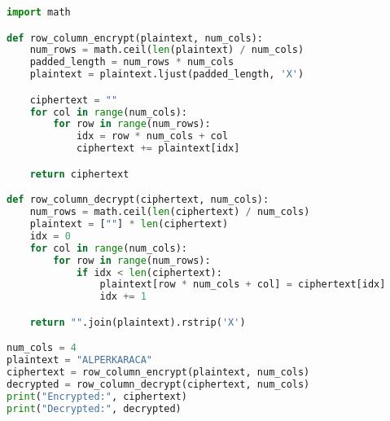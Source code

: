\begin{lstlisting}[language=Python]
import math

def row_column_encrypt(plaintext, num_cols):
    num_rows = math.ceil(len(plaintext) / num_cols)
    padded_length = num_rows * num_cols
    plaintext = plaintext.ljust(padded_length, 'X')

    ciphertext = ""
    for col in range(num_cols):
        for row in range(num_rows):
            idx = row * num_cols + col
            ciphertext += plaintext[idx]

    return ciphertext

def row_column_decrypt(ciphertext, num_cols):
    num_rows = math.ceil(len(ciphertext) / num_cols)
    plaintext = [""] * len(ciphertext)
    idx = 0
    for col in range(num_cols):
        for row in range(num_rows):
            if idx < len(ciphertext):
                plaintext[row * num_cols + col] = ciphertext[idx]
                idx += 1

    return "".join(plaintext).rstrip('X')

num_cols = 4
plaintext = "ALPERKARACA"
ciphertext = row_column_encrypt(plaintext, num_cols)
decrypted = row_column_decrypt(ciphertext, num_cols)
print("Encrypted:", ciphertext)
print("Decrypted:", decrypted)
\end{lstlisting}

\newpage